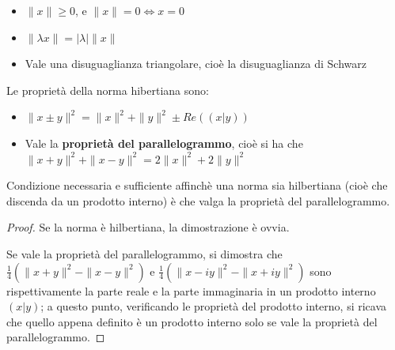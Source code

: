 \begin{itemize}
\item $\|x\| \geq 0$, e $\|x\|=0 \iff x=0$
\item$\| \lambda x\|=| \lambda| \|x\|$
\item Vale una disuguaglianza triangolare, cioè la disuguaglianza di Schwarz
\end{itemize} Le proprietà della norma hibertiana sono:

\begin{itemize}
\item $\|x \pm y\|^2= \|x\|^2 +\|y\|^2 \pm Re((x|y))$
\item Vale la \textbf{proprietà del parallelogrammo}, cioè si ha che $\|x+y\|^2+\|x-y\|^2=2\|x\|^2 + 2 \|y\|^2$
\end{itemize}

\begin{teorema}

Condizione necessaria e sufficiente affinchè una norma sia  hilbertiana (cioè che discenda da un prodotto interno) è che valga la proprietà  del parallelogrammo.
\end{teorema}

\begin{proof} Se la norma è hilbertiana, la dimostrazione è ovvia.

Se vale la proprietà del parallelogrammo, si dimostra che $\frac{1}{4} (\|x+y\|^2-\|x-y\|^2)$ e  $\frac{1}{4} (\|x-iy\|^2-\|x+iy\|^2)$ sono rispettivamente la parte reale e la parte immaginaria in un prodotto interno $(x|y)$; a questo punto, verificando le proprietà del prodotto interno, si ricava che quello appena definito è un prodotto interno solo se vale la proprietà del parallelogrammo.

\end{proof}

